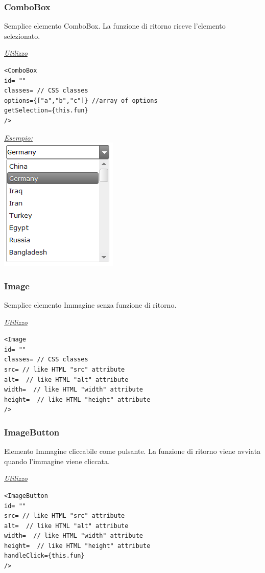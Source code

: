 \subsubsection{ComboBox}
Semplice elemento ComboBox. La funzione di ritorno riceve l'elemento selezionato.
\begin{center}
\underline{\textit{Utilizzo}}
\begin{lstlisting}
<ComboBox
id= ""
classes= // CSS classes
options={["a","b","c"]} //array of options
getSelection={this.fun}
/>
\end{lstlisting}
\underline{\textit{Esempio:}}
\\
\includegraphics[scale=0.9]{img/combobox.png}

\end{center}

\subsubsection{Image}
Semplice elemento Immagine senza funzione di ritorno.
\begin{center}
\underline{\textit{Utilizzo}}
\begin{lstlisting}
<Image
id= ""
classes= // CSS classes
src= // like HTML "src" attribute
alt=  // like HTML "alt" attribute
width=  // like HTML "width" attribute
height=  // like HTML "height" attribute
/>
\end{lstlisting}
\end{center}
\newpage
\subsubsection{ImageButton}
Elemento Immagine cliccabile come pulsante. La funzione di ritorno viene avviata quando l'immagine viene cliccata.
\begin{center}
\underline{\textit{Utilizzo}}
\begin{lstlisting}
<ImageButton
id= ""
src= // like HTML "src" attribute
alt=  // like HTML "alt" attribute
width=  // like HTML "width" attribute
height=  // like HTML "height" attribute
handleClick={this.fun}
/>
\end{lstlisting}
\end{center}


